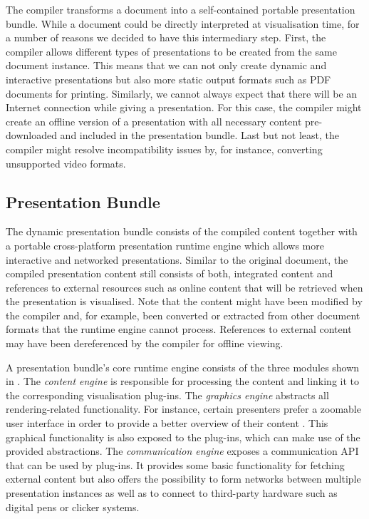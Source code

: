     The compiler transforms a \mxp document into a self-contained portable \mxp
    presentation bundle. While a \mxp document could be directly interpreted at
    visualisation time, for a number of reasons we decided to have this
    intermediary step. First, the compiler allows different types of
    presentations to be created from the same \mxp document instance. This
    means that we can not only create dynamic and interactive presentations but
    also more static output formats such as PDF documents for printing.
    Similarly, we cannot always expect that there will be an Internet
    connection while giving a presentation. For this case, the compiler might
    create an offline version of a presentation with all necessary content
    pre-downloaded and included in the \mxp presentation bundle.  Last but not
    least, the compiler might resolve incompatibility issues by, for instance,
    converting unsupported video formats.

   \subsection{\mxp Presentation Bundle}

    The dynamic \mxp presentation bundle consists of the compiled content
    together with a portable cross-platform presentation runtime engine which
    allows more interactive and networked presentations. Similar to the
    original document, the compiled presentation content still consists of
    both, integrated content and references to external resources such as
    online content that will be retrieved when the presentation is visualised.
    Note that the content might have been modified by the compiler and, for
    example, been converted or extracted from other document formats that the
    runtime engine cannot process.  References to external content may have
    been dereferenced by the compiler for offline viewing.

    A presentation bundle's core runtime engine consists of the three modules
    shown in . The \emph{content engine} is responsible
    for processing the content and linking it to the corresponding
    visualisation plug-ins. The \emph{graphics engine} abstracts all
    rendering-related functionality. For instance, certain presenters prefer a
    zoomable user interface in order to provide a better overview of their
    content \citep{reuss-1}. This graphical functionality is also exposed to
    the plug-ins, which can make use of the provided abstractions. The
    \emph{communication engine} exposes a communication API that can be used by
    plug-ins. It provides some basic functionality for fetching external
    content but also offers the possibility to form networks between multiple
    \mxp presentation instances as well as to connect to third-party hardware
    such as digital pens or clicker systems.

